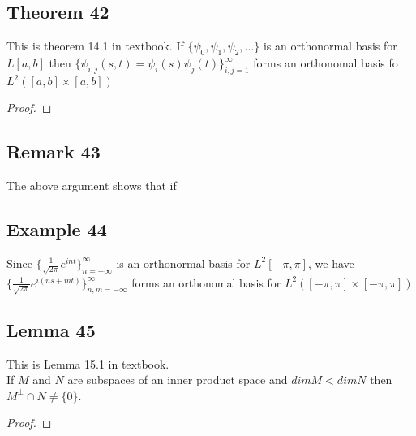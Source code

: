\documentclass{article}
\begin{document}
\subsection *{Theorem 42}
This is theorem 14.1 in textbook.
If $\{\psi_0,\psi_1,\psi_2,...\}$ is an orthonormal basis for $L[a,b]$ then $\{ \psi_{i,j}(s,t)=\psi_i(s)\psi_j(t)\}_{i,j=1}^{\infty}$ forms an orthonomal basis fo $L^2([a,b]\times[a,b])$
\begin{proof}
\end{proof}

\subsection *{Remark 43}
The above argument shows that if 

\subsection *{Example 44}
Since $\{\frac{1}{\sqrt{2\pi}}e^{int}\}_{n=-\infty}^{\infty}$ is an orthonormal basis for $L^2[-\pi, \pi]$, we have $\{\frac{1}{\sqrt{2\pi}}e^{i(ns+mt)}\}_{n,m=-\infty}^{\infty}$ forms an orthonomal basis for $L^2([-\pi, \pi]\times[-\pi, \pi])$

\subsection *{Lemma 45}
This is Lemma 15.1 in textbook.\\
If $M$ and $N$ are subspaces of an inner product space and $dim M < dim N$ then $M^\bot \cap N \neq \{0\}$.
\begin{proof}
\end{proof}
 
\end{document}
